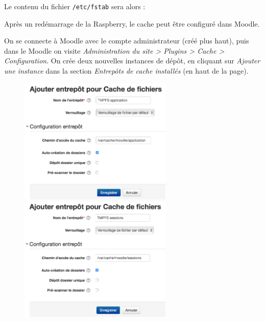 \documentclass[11pt]{article}
\begin{document}
%
Le contenu du fichier \lstinline{/etc/fstab} sera alors :


Après un redémarrage de la Raspberry, le cache peut être configuré dans Moodle.

On se connecte à Moodle avec le compte administrateur (créé plus haut), puis dans le Moodle on visite \emph{Administration du site > Plugins > Cache > Configuration}. On crée deux nouvelles instances de dépôt, en cliquant sur \emph{Ajouter une instance} dans la section \emph{Entrepôts de cache installés} (en haut de la page).

\begin{figure}[!ht]
\begin{minipage}[b]{0.45\linewidth} %
\centering
\includegraphics[width=7.3cm]{cache-application.png}
\end{minipage}
\hspace{\fill} %
\begin{minipage}[b]{0.45\linewidth}
\centering
\includegraphics[width=7.3cm]{cache-sessions.png}
\end{minipage}
\end{figure}
\end{document}
